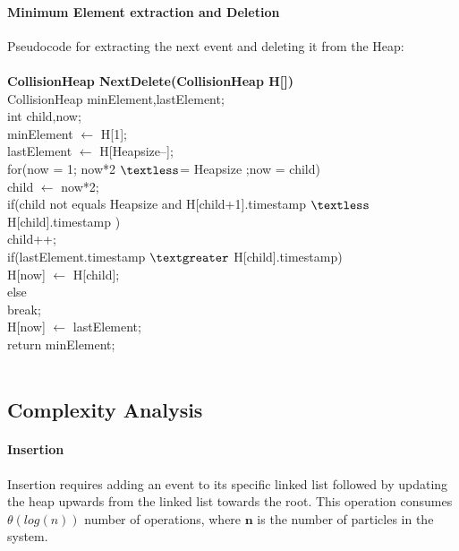\documentclass[12pt]{article}
\begin{document}
\paragraph{Minimum Element extraction and Deletion}
Pseudocode for extracting the next event and deleting it from the Heap:\\ \\

\textbf{CollisionHeap NextDelete(CollisionHeap H[])}\\

        \indent CollisionHeap minElement,lastElement;\\
        \indent int child,now;\\
        \indent minElement $\leftarrow$ H[1];\\
        \indent lastElement $\leftarrow$ H[Heapsize--];\\

        \indent for(now = 1; now*2 $\textless$= Heapsize ;now = child)\\
                \indent\indent child $\leftarrow$ now*2;\\          
                \indent\indent if(child not equals Heapsize and H[child+1].timestamp $\textless$ H[child].timestamp ) \\
                        \indent\indent\indent child++;\\
                \indent\indent if(lastElement.timestamp $\textgreater$ H[child].timestamp)\\
                        \indent\indent\indent H[now] $\leftarrow$ H[child];\\
                \indent\indent else\\
                        \indent\indent\indent break;\\
        \indent H[now] $\leftarrow$ lastElement;\\
        \indent return minElement;\\
\\

\subsection{Complexity Analysis}\label{Complexity Analysis}
\paragraph{Insertion}
Insertion requires adding an event to its specific linked list followed by updating the heap upwards from the linked list towards the root. This operation consumes $\theta(log(n))$ number of operations, where $\mathbf{n}$ is the number of particles in the system.
 
\end{document}
